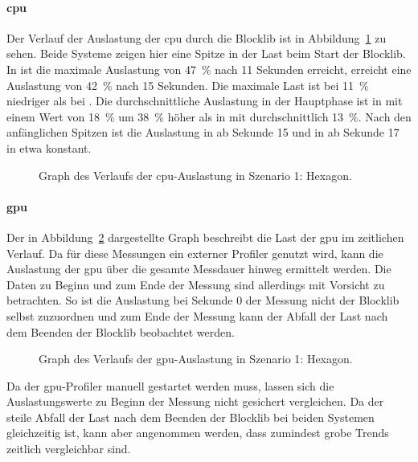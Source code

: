 \paragraph{\ac{cpu}} Der Verlauf der Auslastung der \ac{cpu} durch die Blocklib ist in Abbildung~\ref{fig:seed-0-hexagon-cpu} zu sehen. Beide Systeme zeigen hier eine Spitze in der Last beim Start der Blocklib. In \sysA{} ist die maximale Auslastung von \SI{47}{\percent} nach 11 Sekunden erreicht, \sysB{} erreicht eine Auslastung von \SI{42}{\percent} nach 15 Sekunden. Die maximale Last ist bei \sysB{} \SI{11}{\percent} niedriger als bei \sysA{}. Die durchschnittliche Auslastung in der Hauptphase ist in \sysB{} mit einem Wert von \SI{18}{\percent} um \SI{38}{\percent} höher als in \sysB{} mit durchschnittlich \SI{13}{\percent}. Nach den anfänglichen Spitzen ist die Auslastung in \sysA{} ab Sekunde 15 und in \sysB{} ab Sekunde 17 in etwa konstant.
\begin{figure}[!htbp]
	\caption[Graph des Verlaufs der -Auslastung in Szenario 1: Hexagon.]{Graph des Verlaufs der \ac{cpu}-Auslastung in Szenario 1: Hexagon.}\label{fig:seed-0-hexagon-cpu}
\end{figure}


\paragraph{\ac{gpu}} Der in Abbildung~\ref{fig:seed-0-hexagon-gpu} dargestellte Graph beschreibt die Last der \ac{gpu} im zeitlichen Verlauf. Da für diese Messungen ein externer Profiler genutzt wird, kann die Auslastung der \ac{gpu} über die gesamte Messdauer hinweg ermittelt werden. Die Daten zu Beginn und zum Ende der Messung sind allerdings mit Vorsicht zu betrachten. So ist die Auslastung bei Sekunde $0$ der Messung nicht der Blocklib selbst zuzuordnen und zum Ende der Messung kann der Abfall der Last nach dem Beenden der Blocklib beobachtet werden. 
\begin{figure}[!htbp]
	\caption[Graph des Verlaufs der -Auslastung in Szenario 1: Hexagon.]{Graph des Verlaufs der \ac{gpu}-Auslastung in Szenario 1: Hexagon.}\label{fig:seed-0-hexagon-gpu}
\end{figure}

Da der \ac{gpu}-Profiler manuell gestartet werden muss, lassen sich die Auslastungswerte zu Beginn der Messung nicht gesichert vergleichen. Da der steile Abfall der Last nach dem Beenden der Blocklib bei beiden Systemen gleichzeitig ist, kann aber angenommen werden, dass zumindest grobe Trends zeitlich vergleichbar sind.

